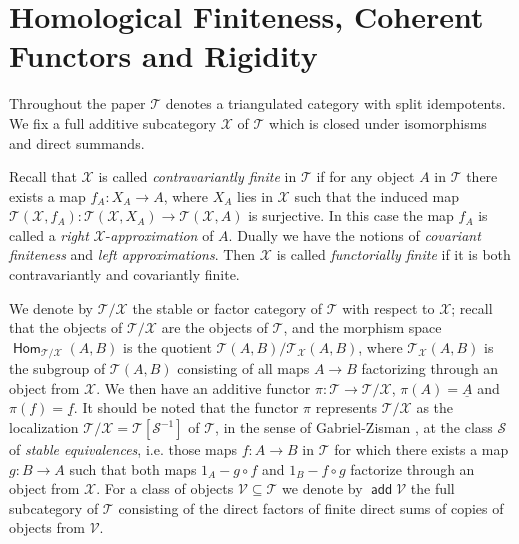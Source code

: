 \documentclass[oneside, a4paper,reqno]{amsart}
\numberwithin{equation}{section}
\theoremstyle{definition}
\begin{document}
   
  
\section{Homological Finiteness, Coherent Functors and  Rigidity}

Throughout the paper ${\mathcal T}$ denotes a triangulated category with split idempotents. We fix a full additive subcategory ${\mathcal X}$ of ${\mathcal T}$ which is closed under isomorphisms and direct summands. 

Recall that ${\mathcal X}$ is called {\em contravariantly finite} in ${\mathcal T}$ if for any object $A$ in ${\mathcal T}$ there exists a map $f_{A} \colon X_{A} {\longrightarrow} A$, where $X_{A}$ lies in ${\mathcal X}$ such that the induced map ${\mathcal T}({\mathcal X},f_{A}) \colon {\mathcal T}({\mathcal X},X_{A}) {\longrightarrow} {\mathcal T}({\mathcal X},A)$ is surjective. In this case the map $f_{A}$ is called a {\em right} ${\mathcal X}$-{\em approximation} of $A$.  Dually we have the notions of {\em covariant finiteness} and {\em left approximations}.  Then ${\mathcal X}$ is called {\em functorially finite} if it is both contravariantly and covariantly finite. 

We denote by ${\mathcal T}/{\mathcal X}$ the stable or factor category of ${\mathcal T}$ with respect to ${\mathcal X}$; recall that the objects of ${\mathcal T}/{\mathcal X}$ are the objects of ${\mathcal T}$, and the morphism space $\operatorname{\mathsf{Hom}}_{{\mathcal T}/{\mathcal X}}(A,B)$  is the quotient ${\mathcal T}(A,B)/{\mathcal T}_{\mathcal X}(A,B)$, where ${\mathcal T}_{\mathcal X}(A,B)$ is the subgroup of ${\mathcal T}(A,B)$ consisting of all maps $A {\longrightarrow} B$ factorizing through an object from ${\mathcal X}$. We then have an additive functor $\pi \colon {\mathcal T} {\longrightarrow} {\mathcal T}/{\mathcal X}$, $\pi(A) = {\underline A}$ and $\pi(f) = {\underline f}$. It should be noted that the functor $\pi$ represents ${\mathcal T}/{\mathcal X}$ as the localization ${\mathcal T}/{\mathcal X} = {\mathcal T}[\mathcal S^{-1}]$ of ${\mathcal T}$, in the sense of Gabriel-Zisman \cite{GZ}, at the class $\mathcal S$ of {\em stable equivalences}, i.e.  those maps $f \colon A {\longrightarrow} B$ in ${\mathcal T}$ for which there exists a map $g \colon B {\longrightarrow} A$ such that  both maps $1_{A} - g\circ f$ and $1_{B} - f\circ g$ factorize through an object from ${\mathcal X}$.    
For a class of objects  ${\mathcal V} \subseteq {\mathcal T}$ we denote by $\operatorname*{\mathsf{add}} {\mathcal V}$ the full subcategory of ${\mathcal T}$ consisting of the direct factors of finite direct sums of copies of objects from ${\mathcal V}$.
 
\end{document}
